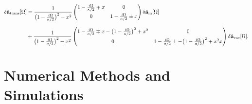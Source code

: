 \begin{equation}
\begingroup
\setlength{\arraycolsep}{5pt}
\renewcommand{\arraystretch}{1.1}
\begin{aligned}
\delta\hat{\mathbf a}_{\mathrm{trans}}[\Omega]
&=
\frac{1}{\bigl(1-\tfrac{i\Omega}{\kappa/2}\bigr)^2 - x^2}
\begin{pmatrix}
1-\tfrac{i\Omega}{\kappa/2}\mp x & 0 \\[4pt]
0 & 1-\tfrac{i\Omega}{\kappa/2}\pm x
\end{pmatrix} 
\delta\hat{\mathbf a}_{\mathrm{in}}[\Omega] \\[6pt]
& + \frac{1}{\bigl(1-\tfrac{i\Omega}{\kappa/2}\bigr)^2 - x^2} 
\begin{pmatrix}
1-\tfrac{i\Omega}{\kappa/2}\mp x - \bigl(1-\tfrac{i\Omega}{\kappa/2}\bigr)^2 + x^2 &0\\[4pt]
0 & 1-\tfrac{i\Omega}{\kappa/2}\pm - \bigl(1-\tfrac{i\Omega}{\kappa/2}\bigr)^2 + x^2x
\end{pmatrix}
\delta\hat{\mathbf a}_{\mathrm{vac}}[\Omega].
\end{aligned}
\endgroup
\end{equation}
\section{Numerical Methods and Simulations}
